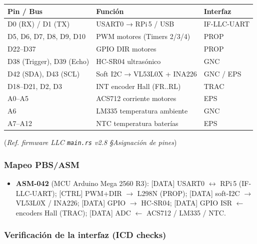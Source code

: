 \begin{center}
\small
\renewcommand{\arraystretch}{1.3}
\begin{tabular}{lll}
\toprule
\textbf{Pin / Bus} & \textbf{Función} & \textbf{Interfaz} \\
\midrule
D0 (RX) / D1 (TX)   & USART0 → RPi\,5 / USB    & IF-LLC-UART \\
D5, D6, D7, D8, D9, D10 & PWM motores (Timers 2/3/4) & PROP \\
D22–D37              & GPIO DIR motores           & PROP \\
D38 (Trigger), D39 (Echo) & HC-SR04 ultrasónico  & GNC \\
D42 (SDA), D43 (SCL) & Soft I2C → VL53L0X + INA226 & GNC / EPS \\
D18–D21, D2, D3      & INT encoder Hall (FR..RL)  & TRAC \\
A0–A5                & ACS712 corriente motores   & EPS \\
A6                   & LM335 temperatura ambiente & GNC \\
A7–A12               & NTC temperatura baterías   & EPS \\
\bottomrule
\end{tabular}
\end{center}
(\emph{Ref. firmware LLC \texttt{main.rs} v2.8 §Asignación de pines})

\subsubsection{Mapeo PBS/ASM}

\begin{itemize}
  \item \textbf{ASM-042} (MCU Arduino Mega 2560 R3):
        [DATA] USART0 $\leftrightarrow$ RPi\,5 (IF-LLC-UART);
        [CTRL] PWM+DIR $\rightarrow$ L298N (PROP);
        [DATA] soft-I2C $\rightarrow$ VL53L0X / INA226;
        [DATA] GPIO $\rightarrow$ HC-SR04;
        [DATA] GPIO ISR $\leftarrow$ encoders Hall (TRAC);
        [DATA] ADC $\leftarrow$ ACS712 / LM335 / NTC.
\end{itemize}

\subsubsection{Verificación de la interfaz (ICD checks)}


